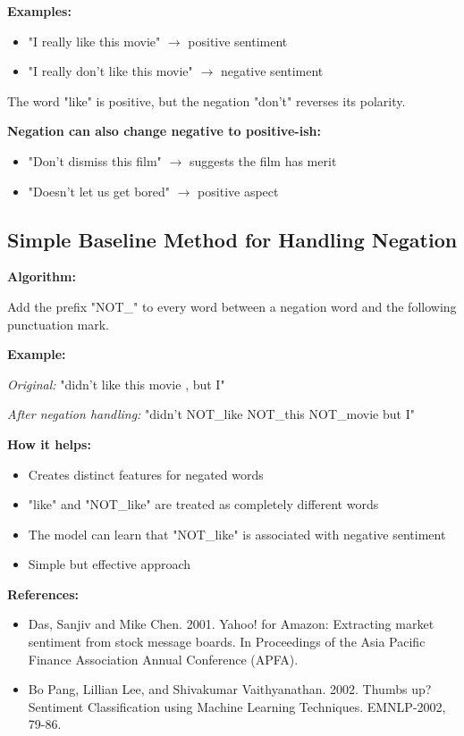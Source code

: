\documentclass[11pt,a4paper]{article}
\theoremstyle{definition}
\theoremstyle{plain}
\theoremstyle{remark}
\begin{document}
\textbf{Examples:}
\begin{itemize}
    \item "I really like this movie" $\rightarrow$ positive sentiment
    \item "I really don't like this movie" $\rightarrow$ negative sentiment
\end{itemize}

The word "like" is positive, but the negation "don't" reverses its polarity.

\textbf{Negation can also change negative to positive-ish:}
\begin{itemize}
    \item "Don't dismiss this film" $\rightarrow$ suggests the film has merit
    \item "Doesn't let us get bored" $\rightarrow$ positive aspect
\end{itemize}

\subsection{Simple Baseline Method for Handling Negation}

\textbf{Algorithm:}

Add the prefix "NOT\_" to every word between a negation word and the following punctuation mark.

\textbf{Example:}

\textit{Original:} "didn't like this movie , but I"

\textit{After negation handling:} "didn't NOT\_like NOT\_this NOT\_movie but I"

\textbf{How it helps:}
\begin{itemize}
    \item Creates distinct features for negated words
    \item "like" and "NOT\_like" are treated as completely different words
    \item The model can learn that "NOT\_like" is associated with negative sentiment
    \item Simple but effective approach
\end{itemize}

\textbf{References:}
\begin{itemize}
    \item Das, Sanjiv and Mike Chen. 2001. Yahoo! for Amazon: Extracting market sentiment from stock message boards. In Proceedings of the Asia Pacific Finance Association Annual Conference (APFA).
    \item Bo Pang, Lillian Lee, and Shivakumar Vaithyanathan. 2002. Thumbs up? Sentiment Classification using Machine Learning Techniques. EMNLP-2002, 79-86.
\end{itemize}
\end{document}
